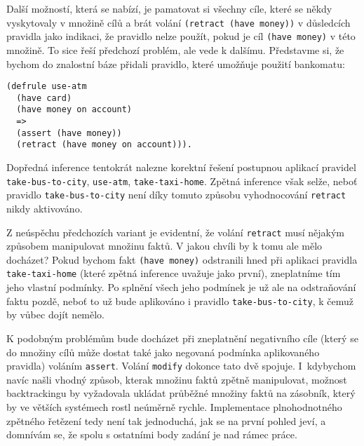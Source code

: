 Další možností, která se nabízí, je pamatovat si všechny cíle, které se někdy
vyskytovaly v množině cílů a brát volání \verb|(retract (have money))| v
důsledcích pravidla jako indikaci, že pravidlo nelze použít, pokud je cíl
\verb|(have money)| v této množině. To sice řeší předchozí problém, ale vede k
dalšímu. Představme si, že bychom do znalostní báze přidali pravidlo, které
umožňuje použití bankomatu:
\begin{verbatim}
(defrule use-atm
  (have card)
  (have money on account)
  =>
  (assert (have money))
  (retract (have money on account))).
\end{verbatim}
Dopředná inference tentokrát nalezne korektní řešení postupnou aplikací pravidel
\verb|take-bus-to-city|, \verb|use-atm|, \verb|take-taxi-home|. Zpětná inference
však selže, neboť pravidlo \verb|take-bus-to-city| není díky tomuto způsobu
vyhodnocování \verb|retract| nikdy aktivováno.

Z neúspěchu předchozích variant je evidentní, že volání \verb|retract| musí
nějakým způsobem manipulovat množinu faktů. V jakou chvíli by k tomu ale mělo
docházet? Pokud bychom fakt \verb|(have money)| odstranili hned při aplikaci
pravidla \verb|take-taxi-home| (které zpětná inference uvažuje jako první),
zneplatníme tím jeho vlastní podmínky. Po splnění všech jeho podmínek je už ale
na odstraňování faktu pozdě, neboť to už bude aplikováno i pravidlo
\verb|take-bus-to-city|, k čemuž by vůbec dojít nemělo.

K podobným problémům bude docházet při zneplatnění negativního cíle (který se do
množiny cílů může dostat také jako negovaná podmínka aplikovaného pravidla) voláním
\verb|assert|. Volání \verb|modify| dokonce tato dvě spojuje. I~kdybychom navíc
našli vhodný způsob, kterak množinu faktů zpětně manipulovat, možnost
backtrackingu by vyžadovala ukládat průběžné množiny faktů na zásobník, který by
ve větších systémech rostl neúměrně rychle. Implementace plnohodnotného zpětného
řetězení tedy není tak jednoduchá, jak se na první pohled jeví, a domnívám se, že
spolu s ostatními body zadání je nad rámec práce.
